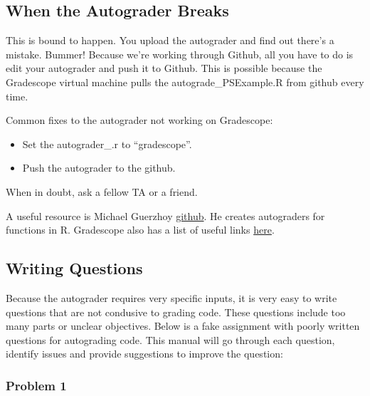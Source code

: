 \documentclass[
]{article}
\begin{document}
\hypertarget{when-the-autograder-breaks}{%
\subsection{When the Autograder
Breaks}\label{when-the-autograder-breaks}}

This is bound to happen. You upload the autograder and find out there's
a mistake. Bummer! Because we're working through Github, all you have to
do is edit your autograder and push it to Github. This is possible
because the Gradescope virtual machine pulls the autograde\_PSExample.R
from github every time.

Common fixes to the autograder not working on Gradescope:

\begin{itemize}
\item
  Set the autograder\_.r to ``gradescope''.
\item
  Push the autograder to the github.
\end{itemize}

When in doubt, ask a fellow TA or a friend.

A useful resource is Michael Guerzhoy
\href{https://github.com/guerzh/r_autograde_gradescope}{github}. He
creates autograders for functions in R. Gradescope also has a list of
useful links
\href{https://gradescope-autograders.readthedocs.io/en/latest/resources/}{here}.

\hypertarget{writing-questions}{%
\subsection{Writing Questions}\label{writing-questions}}

Because the autograder requires very specific inputs, it is very easy to
write questions that are not condusive to grading code. These questions
include too many parts or unclear objectives. Below is a fake assignment
with poorly written questions for autograding code. This manual will go
through each question, identify issues and provide suggestions to
improve the question:

\begin{center}

\end{center}

\hypertarget{problem-1}{%
\subsubsection{Problem 1}\label{problem-1}}
\end{document}

